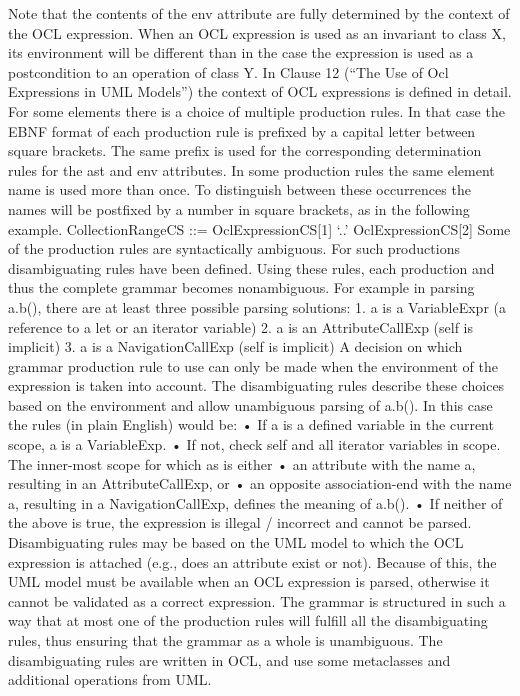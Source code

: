 \documentclass{scrreprt}   %
\begin{document}
Note that the contents of the env attribute are fully determined by the context of the OCL expression. When an OCL
expression is used as an invariant to class X, its environment will be different than in the case the expression is used as a
postcondition to an operation of class Y. In Clause 12 (“The Use of Ocl Expressions in UML Models”) the context of
OCL expressions is defined in detail.
For some elements there is a choice of multiple production rules. In that case the EBNF format of each production rule is
prefixed by a capital letter between square brackets. The same prefix is used for the corresponding determination rules for
the ast and env attributes.
In some production rules the same element name is used more than once. To distinguish between these occurrences the
names will be postfixed by a number in square brackets, as in the following example.
CollectionRangeCS ::= OclExpressionCS[1] ‘..’ OclExpressionCS[2]
Some of the production rules are syntactically ambiguous. For such productions disambiguating rules have been defined.
Using these rules, each production and thus the complete grammar becomes nonambiguous. For example in parsing a.b(),
there are at least three possible parsing solutions:
1. a is a VariableExpr (a reference to a let or an iterator variable)
2. a is an AttributeCallExp (self is implicit)
3. a is a NavigationCallExp (self is implicit)
A decision on which grammar production rule to use can only be made when the environment of the expression is taken
into account. The disambiguating rules describe these choices based on the environment and allow unambiguous parsing
of a.b(). In this case the rules (in plain English) would be:
• If a is a defined variable in the current scope, a is a VariableExp.
• If not, check self and all iterator variables in scope. The inner-most scope for which as is either
• an attribute with the name a, resulting in an AttributeCallExp, or
• an opposite association-end with the name a, resulting in a NavigationCallExp, defines the meaning of a.b().
• If neither of the above is true, the expression is illegal / incorrect and cannot be parsed.
Disambiguating rules may be based on the UML model to which the OCL expression is attached (e.g., does an attribute
exist or not). Because of this, the UML model must be available when an OCL expression is parsed, otherwise it cannot
be validated as a correct expression. The grammar is structured in such a way that at most one of the production rules will
fulfill all the disambiguating rules, thus ensuring that the grammar as a whole is unambiguous. The disambiguating rules
are written in OCL, and use some metaclasses and additional operations from UML.
\end{document}
